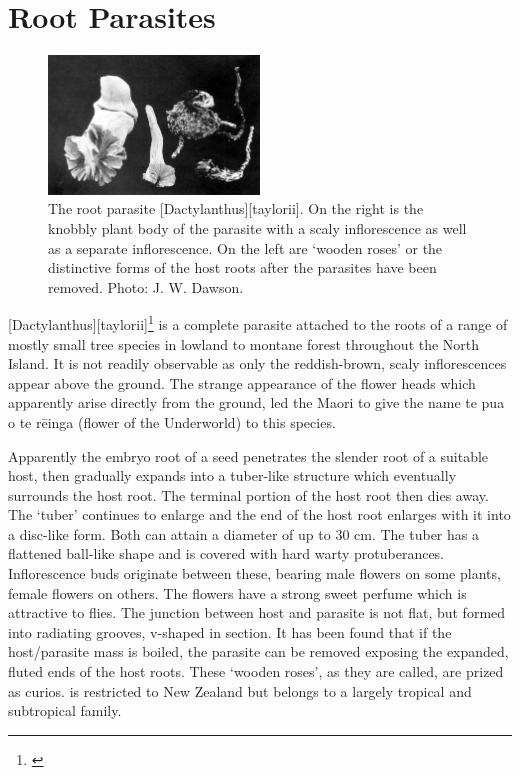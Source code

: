 \section{Root Parasites}

\begin{figure}
	\includegraphics[width=0.5\textwidth]{graphics/figure58dactylanthus.jpg}
	\centering
	\caption[The root parasite \emph{Dactylanthus taylorii}]{The root parasite [Dactylanthus][taylorii].
	On the right is the knobbly plant body of the parasite with a scaly inflorescence as well as a separate inflorescence.
	On the left are `wooden roses' or the distinctive forms of the host roots after the parasites have been removed.
	Photo: J. W. Dawson.}%
	\label{fig:58dactylanthus}
\end{figure}

[Dactylanthus][taylorii]\footnote{\cite{moore1940structure}} is a complete parasite attached to the roots of a range of mostly small tree species in lowland to montane forest throughout the North Island.
It is not readily observable as only the reddish-brown, scaly inflorescences appear above the ground.
The strange appearance of the flower heads which apparently arise directly from the ground, led the Maori to give the name te pua o te rēinga (flower of the Underworld) to this species.

Apparently the embryo root of a  seed penetrates the slender root of a suitable host, then gradually expands into a tuber-like structure which eventually surrounds the host root.
The terminal portion of the host root then dies away.
The `tuber' continues to enlarge and the end of the host root enlarges with it into a disc-like form.
Both can attain a diameter of up to 30 cm.
The tuber has a flattened ball-like shape and is covered with hard warty protuberances.
Inflorescence buds originate between these, bearing male flowers on some plants, female flowers on others.
The flowers have a strong sweet perfume which is attractive to flies.
The junction between host and parasite is not flat, but formed into radiating grooves, v-shaped in section.
It has been found that if the host/parasite mass is boiled, the parasite can be removed exposing the expanded, fluted ends of the host roots.
These `wooden roses', as they are called, are prized as curios.  is restricted to New Zealand but belongs to a largely tropical and subtropical family.

